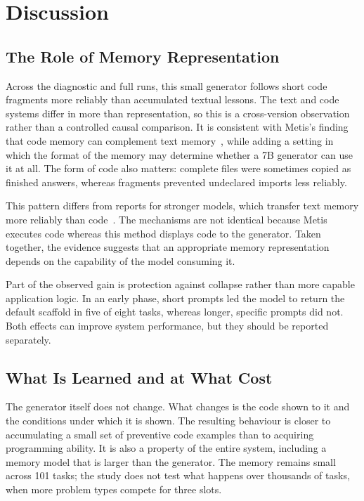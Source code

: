 \chapter{Discussion}
\label{chap:discussion}

\section{The Role of Memory Representation}
Across the diagnostic and full runs, this small generator follows short code fragments more reliably than accumulated textual lessons. The text and code systems differ in more than representation, so this is a cross-version observation rather than a controlled causal comparison. It is consistent with Metis's finding that code memory can complement text memory~\cite{dai2026metis}, while adding a setting in which the format of the memory may determine whether a 7B generator can use it at all. The form of code also matters: complete files were sometimes copied as finished answers, whereas fragments prevented undeclared imports less reliably.

This pattern differs from reports for stronger models, which transfer text memory more reliably than code~\cite{dai2026metis,kim2026mtl}. The mechanisms are not identical because Metis executes code whereas this method displays code to the generator. Taken together, the evidence suggests that an appropriate memory representation depends on the capability of the model consuming it.

Part of the observed gain is protection against collapse rather than more capable application logic. In an early phase, short prompts led the model to return the default scaffold in five of eight tasks, whereas longer, specific prompts did not. Both effects can improve system performance, but they should be reported separately.

\section{What Is Learned and at What Cost}
The generator itself does not change. What changes is the code shown to it and the conditions under which it is shown. The resulting behaviour is closer to accumulating a small set of preventive code examples than to acquiring programming ability. It is also a property of the entire system, including a memory model that is larger than the generator. The memory remains small across 101 tasks; the study does not test what happens over thousands of tasks, when more problem types compete for three slots.

